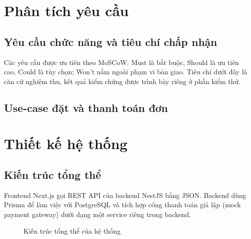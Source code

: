 \documentclass[a4paper]{article}
\begin{document}
\newpage
\section{Phân tích yêu cầu}
\subsection{Yêu cầu chức năng và tiêu chí chấp nhận}
Các yêu cầu được ưu tiên theo MoSCoW: Must là bắt buộc, Should là ưu tiên cao, Could là tùy chọn; Won't nằm ngoài phạm vi bàn giao. Tiêu chí dưới đây là căn cứ nghiệm thu, kết quả kiểm chứng được trình bày riêng ở phần kiểm thử.

\subsection{Use-case đặt và thanh toán đơn}





\section{Thiết kế hệ thống}
\subsection{Kiến trúc tổng thể}
Frontend Next.js gọi REST API của backend NestJS bằng JSON. Backend dùng Prisma để làm việc với PostgreSQL và tích hợp cổng thanh toán giả lập (mock payment gateway) dưới dạng một service riêng trong backend.

\begin{figure}[h!]
\centering
{}
\caption{Kiến trúc tổng thể của hệ thống}
\end{figure}
\end{document}
